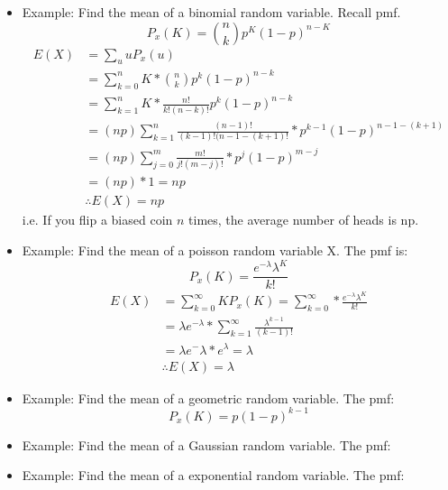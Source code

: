 \documentclass[10pt]{article}
\begin{document}
\begin{flushleft}
\begin{itemize}
    \item Example: Find the mean of a binomial random variable. Recall pmf.
        $$ P_x(K) = \binom{n}{k}p^K(1 - p)^{n - K} $$
        $$ \begin{aligned} 
            E(X) &= \sum_u u P_x(u)  \\
                 &= \sum_{k = 0}^n K * \binom{n}{k} p^k(1 - p)^{n - k} \\
                 &= \sum_{k = 1}^n K * \frac{n!}{k!(n - k)!} p^k(1 - p)^{n - k}
                 \\
                 &= (np) \sum_{k = 1}^n \frac{(n - 1)!}{(k - 1)!(n - 1 - (k +
                 1)!} * p^{k - 1}(1 - p)^{n - 1 - (k + 1)} \\
                 &= (np) \sum_{j = 0}^m \frac{m!}{j!(m - j)!} * p^j (1 - p)^{m -
                 j} \\
                 &= (np) * 1 = np \\
                 &\therefore E(X) = np
        \end{aligned}$$
        i.e. If you flip a biased coin $n$ times, the average number of heads is
        np.
    \item Example: Find the  mean of a poisson random variable X. The pmf is:
        $$ P_x(K) = \frac{e^{-\lambda} \lambda^K}{k!} $$
        $$\begin{aligned}
            E(X) &= \sum_{k = 0}^{\infty} K P_x(K) = \sum_{k = 0}^{\infty} *
            \frac{e^{-\lambda} \lambda^K}{k!}  \\
                 &= \lambda e^{- \lambda} * \sum_{k = 1}^{\infty}
                 \frac{\lambda^{k - 1}}{(k - 1)!} \\
                 &= \lambda e^-\lambda * e^\lambda = \lambda \\
                 &\therefore E(X) = \lambda
    \end{aligned}$$
\item Example: Find the mean of a geometric random variable. The pmf:
    $$ P_x(K) = p(1 - p)^{k - 1} $$

\item Example: Find the mean of a Gaussian random variable. The pmf:

\item Example: Find the mean of a exponential random variable. The pmf:

\end{itemize}

\end{flushleft}
\end{document}
